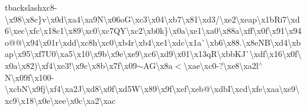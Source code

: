 tbackslash{}xc8-\/\textbackslash{}x98\textbackslash{}x8c\}v\textbackslash{}x0d\textbackslash{}xa4\textbackslash{}xa9\+N\textbackslash{}x06o\+G\textbackslash{}xc3\textbackslash{}x04\textbackslash{}xb7\textbackslash{}x81\textbackslash{}xd3/\textbackslash{}xe2\textbackslash{}xeap\textbackslash{}x1b\+Ri7\textbackslash{}xd6\textbackslash{}xec\textbackslash{}xfc\textbackslash{}x18c1\textbackslash{}x89\textbackslash{}xc0\textbackslash{}xc7\+Q\+Y\textbackslash{}xc2\textbackslash{}xb0k\}\textbackslash{}x0a\textbackslash{}xe1\textbackslash{}xa0\textbackslash{}x88a\textbackslash{}xff\textbackslash{}x0f\textbackslash{}x91\textbackslash{}x94o@@\textbackslash{}x94\textbackslash{}x01r\textbackslash{}xdd\textbackslash{}xc8h\textbackslash{}xc0\textbackslash{}xb4r\textbackslash{}xb4\textbackslash{}xe1\textbackslash{}xdc\textbackslash{}x1a\`{}\textbackslash{}xb6\textbackslash{}x88.\textbackslash{}x8e\+N\+B\textbackslash{}xd4\textbackslash{}xbap\textbackslash{}x95\textbackslash{}xf7\+U0\textbackslash{}xa5\textbackslash{}x10\textbackslash{}x9b\textbackslash{}x9e\textbackslash{}xe9\textbackslash{}xc6\textbackslash{}xd9\textbackslash{}x01\textbackslash{}x13q\+R\textbackslash{}xbb\+K\+J\`{}\textbackslash{}xdf\textbackslash{}x16\textbackslash{}x0f\textbackslash{}x0a\textbackslash{}x82)\textbackslash{}xf4\textbackslash{}xe3!\textbackslash{}x9c\textbackslash{}x8b\textbackslash{}x7f\textbackslash{}x09$\sim$\+A\+G\textbackslash{}x8a$<$\textbackslash{}xae\textquotesingle{}\textbackslash{}xc0-\/?\textbackslash{}xe8\textbackslash{}xa2l$^\wedge$\+N\textbackslash{}x09f\textbackslash{}x100-\/\textbackslash{}xcb\+N\textbackslash{}x9fj\textbackslash{}xf4\textbackslash{}xa2\+J\textbackslash{}xd8\textbackslash{}x0f\textbackslash{}xd5\+W\textbackslash{}x89\textbackslash{}x9f\textbackslash{}xef\textbackslash{}xeb@\textbackslash{}xdb\+I\textbackslash{}xcd\textbackslash{}xfe\textbackslash{}xaa\textbackslash{}xe9\textbackslash{}xc9\textbackslash{}x18\textbackslash{}x0e\textbackslash{}xee\textbackslash{}x0c\textbackslash{}xa2\textbackslash{}xac 